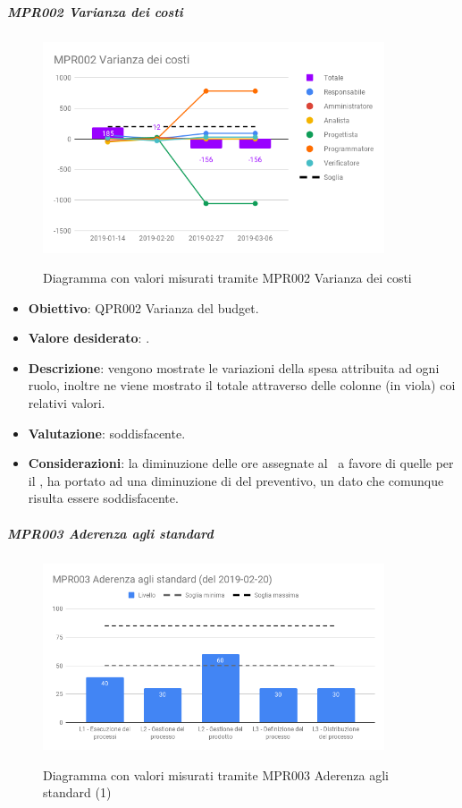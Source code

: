 	\subparagraph{MPR002 Varianza dei costi}

	\begin{figure}[H]
		\centering
		\includegraphics[width=0.9\textwidth]{img/cruscotti/RP/MPR002.png}
		\label{immagineVarianzaCostiRP}
		\caption{Diagramma con valori misurati tramite MPR002 Varianza dei costi}
	\end{figure}

	\begin{itemize}
		\item \textbf{Obiettivo}: QPR002 Varianza del budget.
		\item \textbf{Valore desiderato}: .
		\item \textbf{Descrizione}: vengono mostrate le variazioni della spesa attribuita ad ogni ruolo, inoltre ne viene mostrato il totale attraverso delle colonne (in viola) coi relativi valori.
		\item \textbf{Valutazione}: soddisfacente.
		\item \textbf{Considerazioni}: la diminuzione delle ore assegnate al \Prog\ a favore di quelle per il \Progr, ha portato ad una diminuzione di  del preventivo, un dato che comunque risulta essere soddisfacente.
	\end{itemize}


	\subparagraph{MPR003 Aderenza agli standard}

	\begin{figure}[H]
		\centering
		\includegraphics[width=0.9\textwidth]{img/cruscotti/RP/MPR003(1).png}
		\label{immagineAderenzaStandard1RP}
		\caption{Diagramma con valori misurati tramite MPR003 Aderenza agli standard (1)}
	\end{figure}

